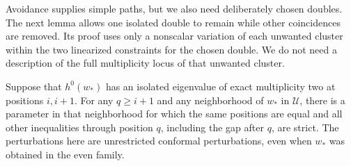 Avoidance supplies simple paths, but we also need deliberately chosen
doubles.  The next lemma allows one isolated double to remain while
other coincidences are removed.  Its proof uses only a nonscalar
variation of each unwanted cluster within the two linearized
constraints for the chosen double.  We do not need a description of
the full multiplicity locus of that unwanted cluster.

\begin{lemma}\label{n:lem-retained-double}
Suppose that \(h^0(w_*)\) has an isolated eigenvalue of exact
multiplicity two at positions \(i,i+1\).  For any \(q\geq i+1\) and
any neighborhood of \(w_*\) in \(\mathcal U\), there is a parameter
in that neighborhood for which the same positions are equal and all
other inequalities through position \(q\), including the gap after
\(q\), are strict.  The perturbations here are unrestricted conformal
perturbations, even when \(w_*\) was obtained in the even family.
\end{lemma}

